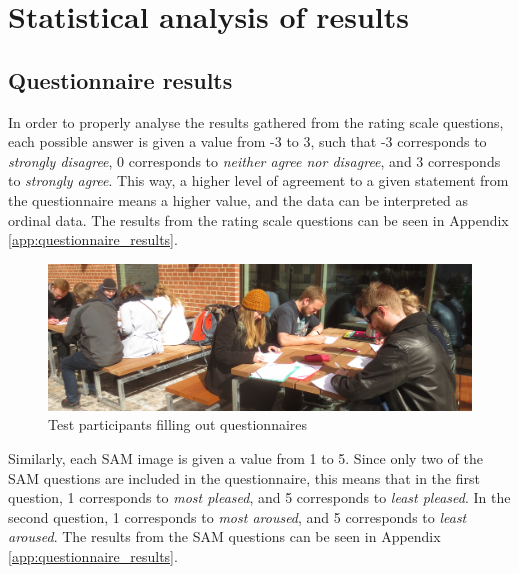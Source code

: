 \section{Statistical analysis of results} 
\subsection{Questionnaire results}
In order to properly analyse the results gathered from the rating scale questions, each possible answer is given a value from -3 to 3, such that -3 corresponds to \textit{strongly disagree}, 0 corresponds to \textit{neither agree nor disagree}, and 3 corresponds to \textit{strongly agree}. This way, a higher level of agreement to a given statement from the questionnaire means a higher value, and the data can be interpreted as ordinal data. The results from the rating scale questions can be seen in Appendix \ref{app:questionnaire_results}.

\begin{figure}[h!]
   \centering
   \includegraphics[width=\textwidth]{figures/participants_questionnaire.jpg}
   \caption{Test participants filling out questionnaires}\label{fig:participants_questionnaire}
\end{figure}
 
Similarly, each SAM image is given a value from 1 to 5. Since only two of the SAM questions are included in the questionnaire, this means that in the first question, 1 corresponds to \textit{most pleased}, and 5 corresponds to \textit{least pleased}. In the second question, 1 corresponds to \textit{most aroused}, and 5 corresponds to \textit{least aroused}. The results from the SAM questions can be seen in Appendix \ref{app:questionnaire_results}.
 

